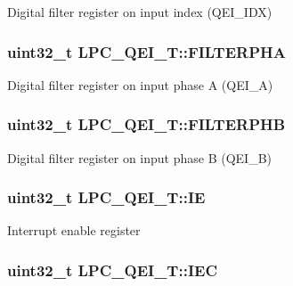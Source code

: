 Digital filter register on input index (Q\-E\-I\-\_\-\-I\-D\-X) \hypertarget{structLPC__QEI__T_ae8de561fff333fbf117036c7de063c36}{
\subsubsection[{F\-I\-L\-T\-E\-R\-P\-H\-A}]{ uint32\-\_\-t L\-P\-C\-\_\-\-Q\-E\-I\-\_\-\-T\-::\-F\-I\-L\-T\-E\-R\-P\-H\-A}}\label{structLPC__QEI__T_ae8de561fff333fbf117036c7de063c36}
Digital filter register on input phase A (Q\-E\-I\-\_\-\-A) \hypertarget{structLPC__QEI__T_a385bbf02e2aa20edde97366861e0ef8d}{
\subsubsection[{F\-I\-L\-T\-E\-R\-P\-H\-B}]{ uint32\-\_\-t L\-P\-C\-\_\-\-Q\-E\-I\-\_\-\-T\-::\-F\-I\-L\-T\-E\-R\-P\-H\-B}}\label{structLPC__QEI__T_a385bbf02e2aa20edde97366861e0ef8d}
Digital filter register on input phase B (Q\-E\-I\-\_\-\-B) \hypertarget{structLPC__QEI__T_a89eace37d24d618b12322f0479b3aefd}{
\subsubsection[{I\-E}]{ uint32\-\_\-t L\-P\-C\-\_\-\-Q\-E\-I\-\_\-\-T\-::\-I\-E}}\label{structLPC__QEI__T_a89eace37d24d618b12322f0479b3aefd}
Interrupt enable register \hypertarget{structLPC__QEI__T_ad4164e0990c509994c19caccf1f7cf61}{
\subsubsection[{I\-E\-C}]{ uint32\-\_\-t L\-P\-C\-\_\-\-Q\-E\-I\-\_\-\-T\-::\-I\-E\-C}}\label{structLPC__QEI__T_ad4164e0990c509994c19caccf1f7cf61}
